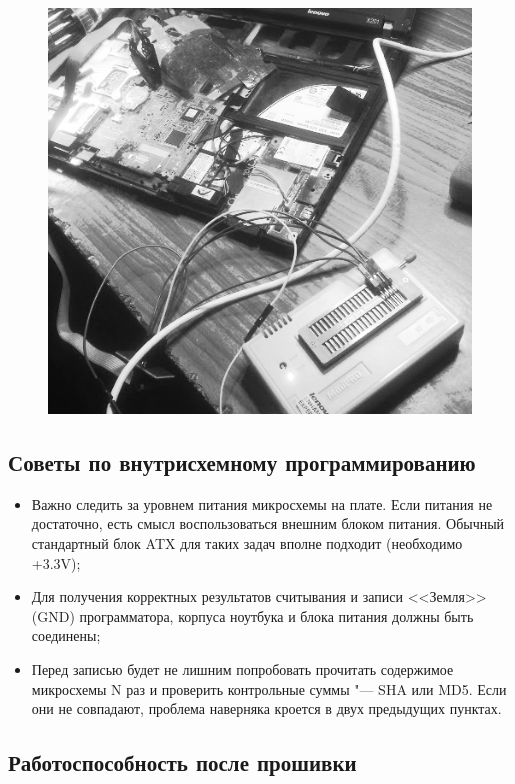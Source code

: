 \documentclass[10pt, a5paper]{article}
\begin{document}
\begin{figure}[h!]
  \centering
  \includegraphics[scale=0.4]{10_2015_fig3}
\end{figure}

\subsection*{Советы по внутрисхемному программированию}

\begin{itemize}
  \item Важно следить за уровнем питания микросхемы на плате. Если питания не достаточно, есть смысл воспользоваться внешним блоком питания. Обычный стандартный блок ATX для таких задач вполне подходит (необходимо +3.3V);
  \item Для получения корректных результатов считывания и записи <<Земля>> (GND) программатора, корпуса ноутбука и блока питания должны быть соединены;
  \item Перед записью будет не лишним попробовать прочитать содержимое микросхемы N раз и проверить контрольные суммы "--- SHA или MD5. Если они не совпадают, проблема наверняка кроется в двух предыдущих пунктах.
\end{itemize}

\subsection*{Работоспособность после прошивки}
\end{document}
